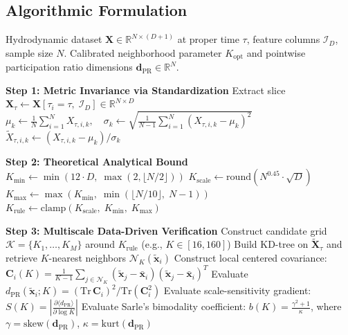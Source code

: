 \subsection{Algorithmic Formulation}
\label{subsec:algorithmic_formulation}

\begin{algorithm}[htbp]
\caption{Adaptive Neighborhood Selection for Local Dimension Estimation}
\label{alg:adaptive_k_selection}
\begin{algorithmic}[1]
\Require Hydrodynamic dataset $\mathbf{X} \in \mathbb{R}^{N \times (D+1)}$ at proper time $\tau$, feature columns $\mathcal{I}_D$, sample size $N$.
\Ensure Calibrated neighborhood parameter $K_{\mathrm{opt}}$ and pointwise participation ratio dimensions $\mathbf{d}_{\mathrm{PR}} \in \mathbb{R}^N$.

\State \textbf{Step 1: Metric Invariance via Standardization}
\State Extract slice $\mathbf{X}_\tau \gets \mathbf{X}[\tau_i = \tau, \; \mathcal{I}_D] \in \mathbb{R}^{N \times D}$
    \State $\mu_k \gets \frac{1}{N}\sum_{i=1}^N X_{\tau, i, k}, \quad \sigma_k \gets \sqrt{\frac{1}{N-1}\sum_{i=1}^N (X_{\tau, i, k} - \mu_k)^2}$
    \State $\tilde{X}_{\tau, i, k} \gets (X_{\tau, i, k} - \mu_k) / \sigma_k$ 
\EndFor

\State \textbf{Step 2: Theoretical Analytical Bound}
\State $K_{\min} \gets \min\left(12 \cdot D, \; \max\left(2, \lfloor N/2 \rfloor\right)\right)$
\State $K_{\mathrm{scale}} \gets \mathrm{round}\left(N^{0.45} \cdot \sqrt{D}\right)$
\State $K_{\max} \gets \max\left(K_{\min}, \; \min\left(\lfloor N/10 \rfloor, \; N - 1\right)\right)$
\State $K_{\mathrm{rule}} \gets \mathrm{clamp}\left(K_{\mathrm{scale}}, \; K_{\min}, \; K_{\max}\right)$

\State \textbf{Step 3: Multiscale Data-Driven Verification}
\State Construct candidate grid $\mathcal{K} = \{K_1, \dots, K_M\}$ around $K_{\mathrm{rule}}$ (e.g., $K \in [16, 160]$)
    \State Build KD-tree on $\tilde{\mathbf{X}}_\tau$ and retrieve $K$-nearest neighbors $\mathcal{N}_K(\tilde{\mathbf{x}}_i)$
    \State Construct local centered covariance: $\mathbf{C}_i(K) = \frac{1}{K-1} \sum_{j \in \mathcal{N}_K} (\tilde{\mathbf{x}}_j - \bar{\mathbf{x}}_i)(\tilde{\mathbf{x}}_j - \bar{\mathbf{x}}_i)^T$
    \State Evaluate $d_{\mathrm{PR}}(\tilde{\mathbf{x}}_i; K) = (\mathrm{Tr}\,\mathbf{C}_i)^2 / \mathrm{Tr}(\mathbf{C}_i^2)$
    \State Evaluate scale-sensitivity gradient: $S(K) = \left| \frac{\partial \langle d_{\mathrm{PR}} \rangle}{\partial \log K} \right|$
    \State Evaluate Sarle's bimodality coefficient: $b(K) = \frac{\gamma^2 + 1}{\kappa}$, where $\gamma = \mathrm{skew}(\mathbf{d}_{\mathrm{PR}})$, $\kappa = \mathrm{kurt}(\mathbf{d}_{\mathrm{PR}})$
\EndFor


\end{algorithmic}
\end{algorithm}
